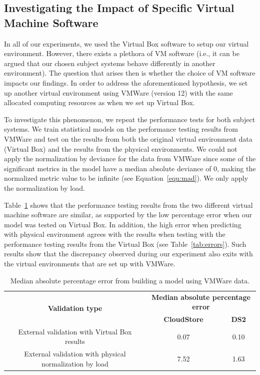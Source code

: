 \documentclass[smallextended]{svjour3}       %
\begin{document}
\subsection{Investigating the Impact of Specific Virtual Machine Software}

In all of our experiments, we used the Virtual Box software to setup our virtual environment. However, there exists a plethora of VM software (i.e., it can be argued that our chosen subject systems behave differently in another environment). The question that arises then is whether the choice of VM software impacts our findings. In order to address the aforementioned hypothesis, we set up another virtual environment using VMWare (version 12) with the same allocated computing resources as when we set up Virtual Box.

To investigate this phenomenon, we repeat the performance tests for both subject systems. We train statistical models on the performance testing results from VMWare and test on the results from both the original virtual environment data (Virtual Box) and the results from the physical environments. We could not apply the normalization by deviance for the data from VMWare since some of the significant metrics in the model have a median absolute deviance of 0, making the normalized metric value to be infinite (see Equation~\ref{equ:mad}). We only apply the normalization by load. 

Table~\ref{tab:vmware} shows that the performance testing results from the two different virtual machine software are similar, as supported by the low percentage error when our model was tested on Virtual Box. In addition, the high error when predicting with physical environment agrees with the results when testing with the performance testing results from the Virtual Box (see Table~\ref{tab:errors}). Such results show that the discrepancy observed during our experiment also exits with the virtual environments that are set up with VMWare.

\begin{table}[tbh]
	\centering
	\caption{Median absolute percentage error from building a model using VMWare data.}
	\label{tab:vmware}
	\begin{tabular}{|c||c|c|}
		\hline
		\multirow{2}{*}{\textbf{Validation type}} & \multicolumn{2}{c|}{\textbf{Median absolute percentage error}} \\ \cline{2-3} 
		& \textbf{CloudStore} & \textbf{DS2} \\ %
		\midrule
		\midrule
		External validation with Virtual Box results& 0.07&0.10\\ \hline
		External validation with physical normalization by load & 7.52& 1.63 \\ \hline
	\end{tabular}
\end{table}
\end{document}
